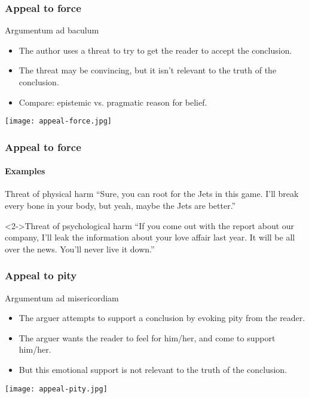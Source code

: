 \documentclass[10pt,letterpaper,xcolor=dvipsnames,handout]{beamer}
\begin{document}
\begin{frame}
  \frametitle{Appeal to force}
  
  \begin{block}{Argumentum ad baculum}
    \begin{itemize}
      \item The author uses a threat to try to get the reader to accept the conclusion.
      \item The threat may be convincing, but it isn't relevant to the truth of the conclusion.
      \item Compare: epistemic vs. pragmatic reason for belief.
    \end{itemize}
  \end{block}
  
  
  \begin{center}
    \texttt{[image: appeal-force.jpg]}
  \end{center}
  
\end{frame}

\begin{frame}
  \frametitle{Appeal to force}
  \framesubtitle{Examples}
  
  \begin{block}{Threat of physical harm}
    ``Sure, you can root for the Jets in this game.  I'll break every bone in your body, but yeah, maybe the Jets are better.''
  \end{block}
  
  \begin{block}<2->{Threat of psychological harm}
    ``If you come out with the report about our company, I'll leak the information about your love affair last year.  It will be all over the news.  You'll never live it down.''
  \end{block}
  
\end{frame}

\begin{frame}
  \frametitle{Appeal to pity}
  
  \begin{block}{Argumentum ad misericordiam}
    \begin{itemize}
      \item The arguer attempts to support a conclusion by evoking pity from the reader.
      \item The arguer wants the reader to feel for him/her, and come to support him/her.
      \item But this emotional support is not relevant to the truth of the conclusion.
    \end{itemize}
  \end{block}
  
  \begin{center}
    \texttt{[image: appeal-pity.jpg]}
  \end{center}
  
\end{frame}
\end{document}
